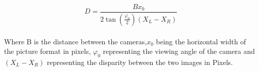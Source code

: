 \begin{equation}
D=\frac{Bx_0}{2\tan(\frac{\varphi_0}{2})(X_{L}-X_{R})}
\end{equation}\\
Where B is the distance between the cameras,$x_0$ being the horizontal width of the picture format in pixels, $\varphi_0$ representing the viewing angle of the camera and $(X_{L}-X_{R})$ representing the disparity between the two images in Pixels.
 




 




